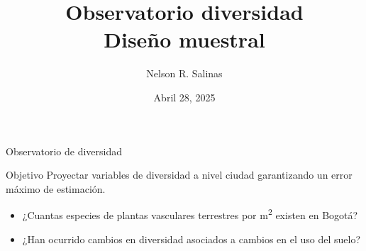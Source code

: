 \documentclass[aspectratio=169, 10pt]{beamer}
\author{Nelson R. Salinas}
\title{Observatorio diversidad \\ Dise\~no muestral}
\institute{Jardín Botánico de Bogotá \\ Conservación \textit{in situ}}
\date{Abril 28, 2025}
\begin{document}
\begin{frame}
\titlepage
\end{frame}


\begin{frame}{Observatorio de diversidad}

\begin{block}{Objetivo}
Proyectar variables de diversidad a nivel ciudad garantizando un error máximo de estimación.
\end{block}


\begin{itemize}

\item<2> ¿Cuantas especies de plantas vasculares terrestres por m\textsuperscript{2} existen en Bogotá?


\item<2> ¿Han ocurrido cambios en diversidad asociados a cambios en el uso del suelo?

\end{itemize}

\end{frame}


\end{document}
